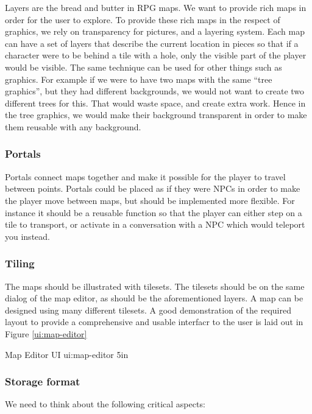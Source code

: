 Layers are the bread and butter in RPG maps. We want to provide rich maps in 
order for the user to explore. To provide these rich maps in the respect of 
graphics, we rely on transparency for pictures, and a layering system. Each
map can have a set of layers that describe the current location in pieces so
that if a character were to be behind a tile with a hole, only the visible part
of the player would be visible. The same technique can be used for other things
such as graphics. For example if we were to have two maps with the same ``tree
graphics'', but they had different backgrounds, we would not want to create two
different trees for this. That would waste space, and create extra work. Hence
in the tree graphics, we would make their background transparent in order to 
make them reusable with any background. 

\subsubsection{Portals} 

Portals connect maps together and make it possible for the player to travel 
between points. Portals could be placed as if they were NPCs in order to make 
the player move between maps, but should be implemented more flexible. For 
instance it should be a reusable function so that the player can either step 
on a tile to transport, or activate in a conversation with a NPC which would
teleport you instead. 

\subsubsection{Tiling}

The maps should be illustrated with tilesets. The tilesets should be on the 
same dialog of the map editor, as should be the aforementioned layers. A map
can be designed using many different tilesets. A good demonstration of the 
required layout to provide a comprehensive and usable interfacr to the user
is laid out in Figure \ref{ui:map-editor}


%
       {Map Editor UI}%
       {ui:map-editor}%
       {5in}

\subsubsection{Storage format} 

We need to think about the following critical aspects: 

